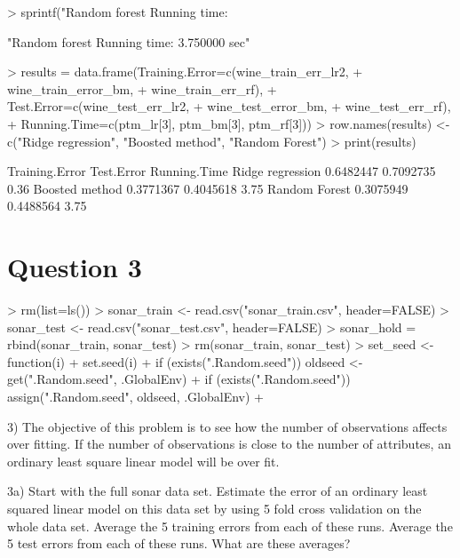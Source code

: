 \documentclass{article}
\begin{document}
\begin{Schunk}
\begin{Sinput}
> sprintf("Random forest Running time: %f sec", ptm_rf[3])
\end{Sinput}
\begin{Soutput}
[1] "Random forest Running time: 3.750000 sec"
\end{Soutput}
\begin{Sinput}
> results = data.frame(Training.Error=c(wine_train_err_lr2, 
+                                       wine_train_error_bm, 
+                                       wine_train_err_rf),
+                      Test.Error=c(wine_test_err_lr2, 
+                                   wine_test_error_bm, 
+                                   wine_test_err_rf),
+                      Running.Time=c(ptm_lr[3], ptm_bm[3], ptm_rf[3]))
> row.names(results) <- c("Ridge regression", "Boosted method", "Random Forest")
> print(results)
\end{Sinput}
\begin{Soutput}
                 Training.Error Test.Error Running.Time
Ridge regression      0.6482447  0.7092735         0.36
Boosted method        0.3771367  0.4045618         3.75
Random Forest         0.3075949  0.4488564         3.75
\end{Soutput}
\end{Schunk}

\section*{Question 3}

\begin{Schunk}
\begin{Sinput}
> rm(list=ls())
> sonar_train <- read.csv("sonar_train.csv", header=FALSE)
> sonar_test <- read.csv("sonar_test.csv", header=FALSE)
> sonar_hold = rbind(sonar_train, sonar_test)
> rm(sonar_train, sonar_test)
> set_seed <- function(i) {
+   set.seed(i)
+   if (exists(".Random.seed"))  oldseed <- get(".Random.seed", .GlobalEnv)
+   if (exists(".Random.seed"))  assign(".Random.seed", oldseed, .GlobalEnv)
+ }
\end{Sinput}
\end{Schunk}

3) The objective of this problem is to see how the number of observations
affects over fitting. If the number of observations is close to the number of
attributes, an ordinary least square linear model will be over fit.

3a) Start with the full sonar data set. Estimate the error of an ordinary least
squared linear model on this data set by using 5 fold cross validation on the
whole data set. Average the 5 training errors from each of these runs.
Average the 5 test errors from each of these runs. What are these averages?
\end{document}
